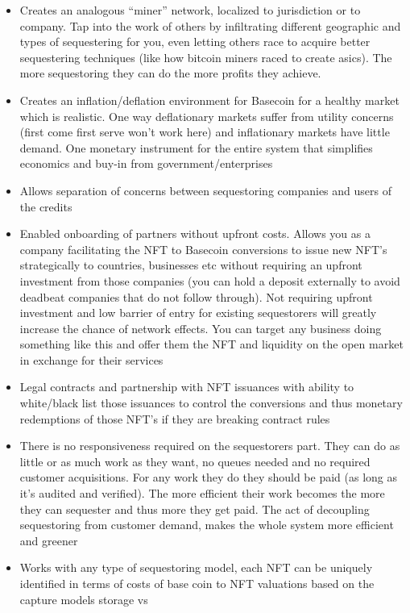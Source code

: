 \documentclass{article}
\begin{document}
\begin{itemize}
\item Creates an analogous “miner” network, localized to jurisdiction or to company. Tap into
the work of others by infiltrating different geographic and types of sequestering for you,
even letting others race to acquire better sequestering techniques (like how bitcoin
miners raced to create asics). The more sequestoring they can do the more profits they
achieve.
\item Creates an inflation/deflation environment for Basecoin for a healthy market which is
realistic. One way deflationary markets suffer from utility concerns (first come first serve
won’t work here) and inflationary markets have little demand. One monetary instrument
for the entire system that simplifies economics and buy-in from government/enterprises
\item Allows separation of concerns between sequestoring companies and users of the
credits
\item Enabled onboarding of partners without upfront costs. Allows you as a company
facilitating the NFT to Basecoin conversions to issue new NFT’s strategically to
countries, businesses etc without requiring an upfront investment from those companies
(you can hold a deposit externally to avoid deadbeat companies that do not follow
through). Not requiring upfront investment and low barrier of entry for existing
sequestorers will greatly increase the chance of network effects. You can target any
business doing something like this and offer them the NFT and liquidity on the open
market in exchange for their services
\item Legal contracts and partnership with NFT issuances with ability to white/black list those
issuances to control the conversions and thus monetary redemptions of those NFT’s if
they are breaking contract rules
\item There is no responsiveness required on the sequestorers part. They can do as little or as
much work as they want, no queues needed and no required customer acquisitions. For
any work they do they should be paid (as long as it's audited and verified). The more
efficient their work becomes the more they can sequester and thus more they get paid.
The act of decoupling sequestoring from customer demand, makes the whole system
more efficient and greener
\item Works with any type of sequestoring model, each NFT can be uniquely identified in
terms of costs of base coin to NFT valuations based on the capture models storage vs

\end{itemize}
\end{document}
